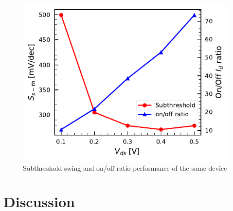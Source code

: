 \documentclass[11pt,a4paper]{report}
\begin{document}
\begin{figure}
    \centering
    \includegraphics[scale=1]{Figures/Batch1/Dev16_Subth-on-off.pdf}
    \caption{Subthreshold swing and on/off ratio performance of the same device}
    \label{fig:Appendix-SS-Onoff}
\end{figure}


\section{Discussion}


\nocite{*}
\printbibliography
\end{document}
